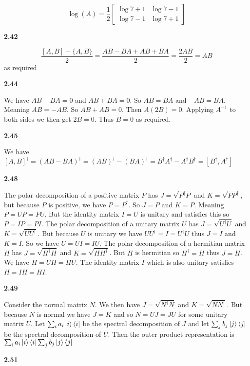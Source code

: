 \[\log(A)= \frac{1}{2}\begin{bmatrix} 
\log{7} + 1 & \log{7} - 1\\
\log{7} - 1 & \log{7} + 1
\end{bmatrix}\]

\textbf{2.42}

\[\frac{[A,B] + \{A,B\}}{2} = \frac{AB-BA + AB+ BA}{2} = \frac{2AB}{2} = AB\]
as required

\textbf{2.44}

We have $ AB -BA = 0$ and $ AB + BA = 0$. So $AB = BA$ and $ -AB = BA$. Meaning $ AB = -AB$. So $ AB+AB = 0$. Then $ A(2B) = 0$. Applying $ A^{-1}$ to both sides we then get $ 2B = 0$. Thus $B=0$ as required.

\textbf{2.45}

We have $ [A,B]^\dag = (AB-BA)^\dag = (AB)^\dag - (BA)^\dag = B^\dag A^\dag - A^\dag B^\dag = [B^\dag, A^\dag]$

\textbf{2.48}

The polar decomposition of a positive matrix $P$ has $J = \sqrt{P^\dag P}$ and $ K = \sqrt{PP^\dag}$, but because $P$ is positive, we have $P = P^\dag$. So $ J = P$ and $K = P$. Meaning $ P = UP= PU$. But the identity matrix $I = U$ is unitary and satisfies this so $P = IP = PI$. The polar decomposition of a unitary matrix $U$ has $J = \sqrt{U^\dag U}$ and $ K = \sqrt{UU^\dag}$. But because $ U $ is unitary we have $ UU^\dag = I = U^\dag U$ thus $ J = I$ and $K = I$. So we have $ U = UI = IU$. The polar decomposition of a hermitian matrix $H$ has $ J = \sqrt{H^\dag H}$ and $K = \sqrt{HH^\dag}$. But $H$ is hermitian so $H^\dag  = H$ thus $J = H$. We have $ H = UH = HU$. The identity matrix $I$ which is also unitary satisfies $ H = IH = HI$.

\textbf{2.49}

Consider the normal matrix $ N$. We then have $ J = \sqrt{N^\dag N}$ and $ K= \sqrt{NN^\dag}$. But because $N$ is normal we have $ J=K$ and so $N = UJ = JU$ for some unitary matrix $U$. Let $ \sum_ia_i\ket{i}\bra{i}$ be the spectral decomposition of $J$ and let $\sum_jb_j\ket{j}\bra{j}$ be the spectral decomposition of $U$. Then the outer product representation is $ \sum_ia_i\ket{i}\bra{i}\sum_jb_j\ket{j}\bra{j}$

\textbf{2.51}

